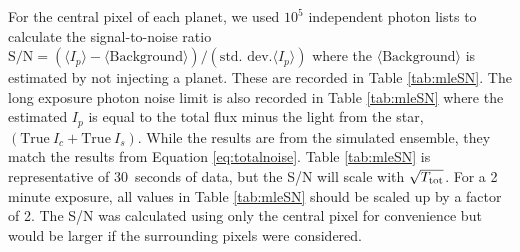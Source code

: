 \documentclass[../main.tex]{subfiles}
\begin{document}
For the central pixel of each planet, we used $10^5$ independent photon lists to calculate the signal-to-noise ratio $\textrm{S/N}=(\langle I_p \rangle - \langle \textrm{Background}\rangle) / (\textrm{std. dev.} \langle I_p \rangle)$ where the $\langle \textrm{Background}\rangle$ is estimated by not injecting a planet. These are recorded in Table \ref{tab:mleSN}. The long exposure photon noise limit is also recorded in Table \ref{tab:mleSN} where the estimated $I_p$ is equal to the total flux minus the light from the star, $(\textrm{True}~I_c + \textrm{True}~I_s)$. While the results are from the simulated ensemble, they match the results from Equation \eqref{eq:totalnoise}. Table \ref{tab:mleSN} is representative of 30~seconds of data, but the S/N will scale with $\sqrt{T_{\rm tot}}$. For a 2 minute exposure, all values in Table \ref{tab:mleSN} should be scaled up by a factor of 2. The S/N was calculated using only the central pixel for convenience but would be larger if the surrounding pixels were considered.
\end{document}
